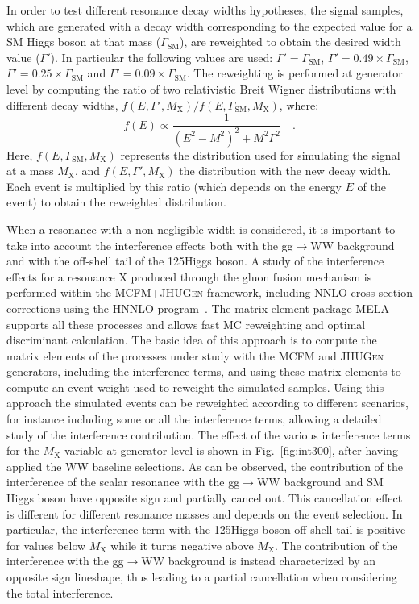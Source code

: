 In order to test different resonance decay widths hypotheses, the signal samples, which are generated with a decay width corresponding to the expected value for a SM Higgs boson at that mass ($\Gamma_\mathrm{SM}$), are reweighted to obtain the desired width value ($\Gamma'$). In particular the following values are used: $\Gamma' = \Gamma_\mathrm{SM}$, $\Gamma' = 0.49 \times \Gamma_\mathrm{SM}$, $\Gamma' = 0.25 \times \Gamma_\mathrm{SM}$ and $\Gamma' = 0.09 \times \Gamma_\mathrm{SM}$.
The reweighting is performed at generator level by computing the ratio of two relativistic Breit Wigner distributions with different decay widths, $f(E,\Gamma',M_\mathrm{X})/f(E,\Gamma_\mathrm{SM},M_\mathrm{X})$, where:
\begin{equation}
f(E) \propto \frac{1}{(E^2 - M^2)^2 + M^2\Gamma^2} \quad .
\end{equation}
Here, $f(E,\Gamma_\mathrm{SM},M_\mathrm{X})$ represents the distribution used for simulating the signal at a mass $M_\mathrm{X}$, and $f(E,\Gamma',M_\mathrm{X})$ the distribution with the new decay width. Each event is multiplied by this ratio (which depends on the energy $E$ of the event) to obtain the reweighted distribution.

When a resonance with a non negligible width is considered, it is important to take into account the interference effects both with the gg$\to$WW background and with the off-shell tail of the 125\GeV Higgs boson.
A study of the interference effects for a resonance X produced through the gluon fusion mechanism is performed within the \textsc{MCFM}+\textsc{JHUGen} framework, including NNLO cross section corrections using the \textsc{HNNLO} program~\cite{Grazzini:2008tf}. The matrix element package MELA supports all these processes and allows fast MC reweighting and optimal discriminant calculation. The basic idea of this approach is to compute the matrix elements of the processes under study with the \textsc{MCFM} and \textsc{JHUGen} generators, including the interference terms, and using these matrix elements to compute an event weight used to reweight the simulated samples. Using this approach the simulated events can be reweighted according to different scenarios, for instance including some or all the interference terms, allowing a detailed study of the interference contribution. The effect of the various interference terms for the $M_\mathrm{X}$ variable at generator level is shown in Fig.~\ref{fig:int300}, after having applied the WW baseline selections. As can be observed, the contribution of the interference of the scalar resonance with the gg$\to$WW background and SM Higgs boson have opposite sign and partially cancel out. This cancellation effect is different for different resonance masses and depends on the event selection.
In particular, the interference term with the 125\GeV Higgs boson off-shell tail is positive for values below $M_\mathrm{X}$ while it turns negative above $M_\mathrm{X}$. The contribution of the interference with the gg$\to$WW background is instead characterized by an opposite sign lineshape, thus leading to a partial cancellation when considering the total interference.

